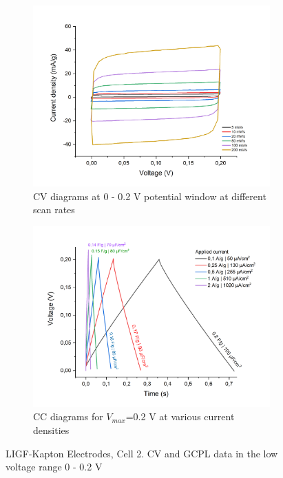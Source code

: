 \begin{figure}[H]
\begin{subfigure}{0.49\textwidth}
\includegraphics[width=1\textwidth]{Figures/Results/Electrochemistry/LIGF-PI-NaNO3-Swagelok/Cell2/CV-V02-Cell2.jpg} 
\captionsetup{width=0.9\linewidth}
\caption{CV diagrams at 0 - 0.2 V potential window at different scan rates}
\label{fig:LIGF-PI-cell2-CV02}
\end{subfigure}
\begin{subfigure}{0.49\textwidth}
\includegraphics[width=1\textwidth]{Figures/Results/Electrochemistry/LIGF-PI-NaNO3-Swagelok/Cell2/GCPL-V02-Cell2-Cs.jpg}
\captionsetup{width=0.9\linewidth}
\caption{CC diagrams for $V_{max}$=0.2 V at various current densities}
\label{fig:LIGF-PI-cell2-CC02}
\end{subfigure}
\medskip
\caption{LIGF-Kapton Electrodes, Cell 2. CV and GCPL data in the low voltage range 0 - 0.2 V}
\label{fig:LIGF-PI-cell2-02}
\end{figure}

